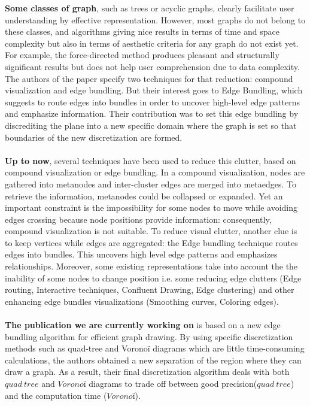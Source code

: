 \textbf{Some classes of graph}, such as trees or acyclic graphs, clearly facilitate user understanding by effective representation. However, most graphs do not belong to these classes, and algorithms giving nice results in terms of time and space complexity but also in terms of aesthetic criteria for any graph do not exist yet. For example, the force-directed method produces pleasant and structurally significant results but does not help user comprehension due to data complexity. The authors of the paper specify two techniques for that reduction: compound visualization and edge bundling. But their interest goes to Edge Bundling, which suggests to route edges into bundles in order to uncover high-level edge patterns and emphasize information. Their contribution was to set this edge bundling by discrediting the plane into a new specific domain where the graph is set so that boundaries of the new discretization are formed.
\\
\\
\textbf{Up to now}, several techniques have been used to reduce this clutter, based on compound visualization or edge bundling. In a compound visualization, nodes are gathered into metanodes and inter-cluster edges are merged into metaedges. To retrieve the information, metanodes could be collapsed or expanded. Yet an important constraint is the impossibility for some nodes to move while avoiding edges crossing because node positions provide information: consequently, compound visualization is not suitable. To reduce visual clutter, another clue is to keep vertices while edges are aggregated: the Edge bundling technique routes edges into bundles. This uncovers high level edge patterns and emphasizes relationships. Moreover, some existing representations take into account the the inability of some nodes to change position i.e.  some reducing edge clutters (Edge routing, Interactive techniques, Confluent Drawing, Edge clustering) and other enhancing edge bundles visualizations (Smoothing curves, Coloring edges). 
\\
\\
\textbf{The publication we are currently working on} is based on a new edge bundling algorithm for efficient graph drawing. By using specific  discretization methods such as quad-tree and Voronoï diagrams which are little time-consuming calculations, the authors obtained a new separation of the region where they can draw a graph. As a result, their final discretization algorithm deals with both $quad~tree$ and $Voronoï$ diagrams to trade off between good precision($quad~tree$) and the computation time ($Voronoï$).

